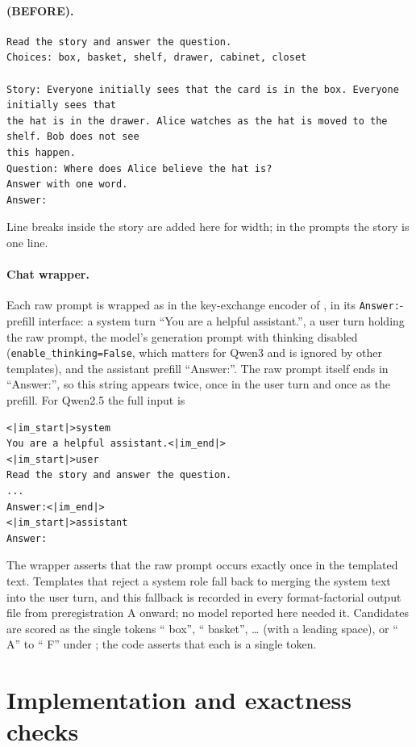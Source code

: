 \paragraph{\fmtBefore{} (BEFORE).}\mbox{}
\begin{verbatim}
Read the story and answer the question.
Choices: box, basket, shelf, drawer, cabinet, closet

Story: Everyone initially sees that the card is in the box. Everyone initially sees that
the hat is in the drawer. Alice watches as the hat is moved to the shelf. Bob does not see
this happen.
Question: Where does Alice believe the hat is?
Answer with one word.
Answer:
\end{verbatim}
Line breaks inside the story are added here for width; in the prompts the story is one line.

\paragraph{Chat wrapper.} Each raw prompt is wrapped as in the key-exchange encoder of \citet{anonymous2026fitted}, in its \texttt{Answer:}-prefill interface: a system turn ``You are a helpful assistant.'', a user turn holding the raw prompt, the model's generation prompt with thinking disabled (\texttt{enable\_thinking=False}, which matters for Qwen3 and is ignored by other templates), and the assistant prefill ``Answer:''. The raw prompt itself ends in ``Answer:'', so this string appears twice, once in the user turn and once as the prefill. For Qwen2.5 the full input is
\begin{verbatim}
<|im_start|>system
You are a helpful assistant.<|im_end|>
<|im_start|>user
Read the story and answer the question.
...
Answer:<|im_end|>
<|im_start|>assistant
Answer:
\end{verbatim}
The wrapper asserts that the raw prompt occurs exactly once in the templated text. Templates that reject a system role fall back to merging the system text into the user turn, and this fallback is recorded in every format-factorial output file from preregistration A onward; no model reported here needed it. Candidates are scored as the single tokens `` box'', `` basket'', \ldots{} (with a leading space), or `` A'' to `` F'' under \fmtLetter{}; the code asserts that each is a single token.

\section{Implementation and exactness checks}\label{app:impl}

